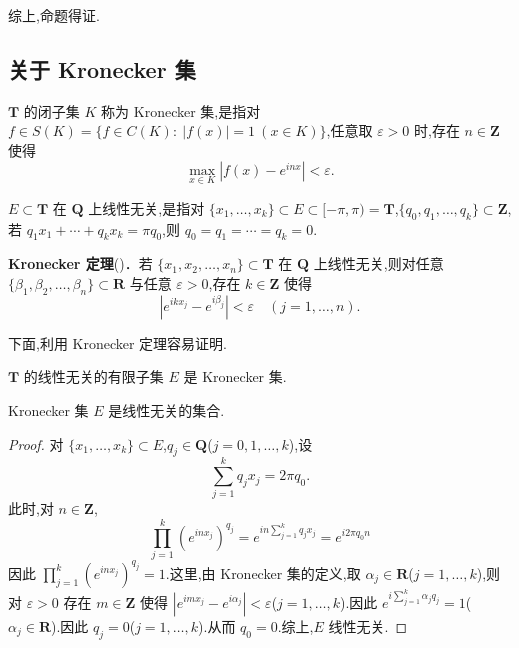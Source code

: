 综上,命题得证.

\subsection{关于 Kronecker 集}\label{sec:3.3.3}

\begin{definition}\label{def:3.3.6}
$\mathbf{T}$ 的闭子集 $K$ 称为 Kronecker 集,是指对 $f \in S(K) = \{f \in C(K):\ |f(x)| = 1\ (x \in K)\}$,任意取 $\varepsilon > 0$ 时,存在 $n \in \mathbf{Z}$ 使得
\begin{equation*}
\max_{x \in K}|f(x) - e^{inx}| < \varepsilon.
\end{equation*}
\end{definition}

\begin{definition}\label{def:3.3.7}
$E \subset \mathbf{T}$ 在 $\mathbf{Q}$ 上线性无关,是指对 $\{x_{1}, \ldots, x_{k}\} \subset E \subset [-\pi, \pi) = \mathbf{T}$,$\{q_{0}, q_{1}, \ldots, q_{k}\} \subset \mathbf{Z}$,若 $q_{1}x_{1} + \cdots + q_{k}x_{k} = \pi q_{0}$,则 $q_{0} = q_{1} = \cdots = q_{k} = 0$.
\end{definition}

\textbf{Kronecker 定理}(\cite{ch3:8})．若 $\{x_{1}, x_{2}, \ldots, x_{n}\} \subset \mathbf{T}$ 在 $\mathbf{Q}$ 上线性无关,则对任意 $\{\beta_{1}, \beta_{2}, \ldots, \beta_{n}\} \subset \mathbf{R}$ 与任意 $\varepsilon > 0$,存在 $k \in \mathbf{Z}$ 使得
\begin{equation*}
\left|e^{ikx_{j}} - e^{i\beta_{j}}\right| < \varepsilon \quad (j = 1, \ldots, n).
\end{equation*}

下面,利用 Kronecker 定理容易证明.

\begin{theorem}\label{thm:3.3.8}
$\mathbf{T}$ 的线性无关的有限子集 $E$ 是 Kronecker 集.
\end{theorem}

\begin{theorem}\label{thm:3.3.9}
Kronecker 集 $E$ 是线性无关的集合.
\end{theorem}

\begin{proof}
对 $\{x_{1}, \ldots, x_{k}\} \subset E$,$q_{j} \in \mathbf{Q}$($j = 0, 1, \ldots, k$),设
\begin{equation*}
\sum_{j=1}^{k}q_{j}x_{j} = 2\pi q_{0}.
\end{equation*}
此时,对 $n \in \mathbf{Z}$,
\begin{equation*}
\prod_{j=1}^{k}(e^{inx_{j}})^{q_{j}} = e^{in\sum_{j=1}^{k}q_{j}x_{j}} = e^{i2\pi q_{0}n}
\end{equation*}
因此 $\prod_{j=1}^{k}(e^{inx_{j}})^{q_{j}} = 1$.这里,由 Kronecker 集的定义,取 $\alpha_{j} \in \mathbf{R}$($j = 1, \ldots, k$),则对 $\varepsilon > 0$ 存在 $m \in \mathbf{Z}$ 使得 $\left|e^{imx_{j}} - e^{i\alpha_{j}}\right| < \varepsilon$($j = 1, \ldots, k$).因此 $e^{i\sum_{j=1}^{k}\alpha_{j}q_{j}} = 1$($\alpha_{j} \in \mathbf{R}$).因此 $q_{j} = 0$($j = 1, \ldots, k$).从而 $q_{0} = 0$.综上,$E$ 线性无关.
\end{proof}

